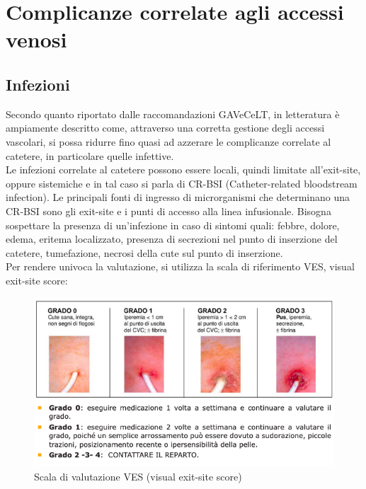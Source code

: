 \section{Complicanze correlate agli accessi venosi}

\subsection{Infezioni}

Secondo quanto riportato dalle raccomandazioni GAVeCeLT, in letteratura è ampiamente descritto come, attraverso una 
corretta gestione degli accessi vascolari, si possa ridurre fino quasi ad azzerare le complicanze correlate al 
catetere, in particolare quelle infettive\cite{GAVECELTracc2021}.\\
Le infezioni correlate al catetere possono essere locali, quindi limitate all’exit-site, oppure sistemiche e in tal 
caso si parla di CR-BSI (Catheter-related bloodstream infection). Le principali fonti di ingresso di microrganismi 
che determinano una CR-BSI sono gli exit-site e i punti di accesso alla linea infusionale. 
Bisogna sospettare la presenza di un’infezione in caso di sintomi quali: febbre, dolore, edema, eritema localizzato, 
presenza di secrezioni nel punto di inserzione del catetere, tumefazione, necrosi della cute sul punto di inserzione\cite{AIOMCVC}.\\
Per rendere univoca la valutazione, si utilizza la scala di riferimento VES, visual exit-site score:

\begin{figure}[H]
    \begin{center}
    \includegraphics[width=0.8\columnwidth]{img/VES.png}
    \vspace{-3mm}
    \end{center}
    \caption{Scala di valutazione VES (visual exit-site score)
    \cite{img51}}

\end{figure}

